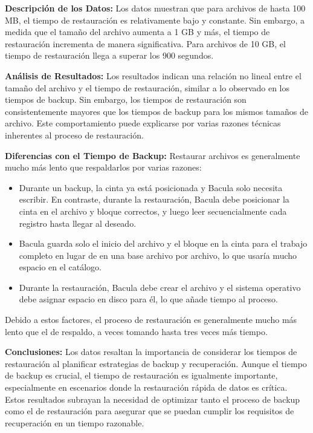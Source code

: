 \textbf{Descripción de los Datos:}
Los datos muestran que para archivos de hasta 100 MB, el tiempo de restauración es relativamente bajo y constante. Sin embargo, a medida que el tamaño del archivo aumenta a 1 GB y más, el tiempo de restauración incrementa de manera significativa. Para archivos de 10 GB, el tiempo de restauración llega a superar los 900 segundos.

\textbf{Análisis de Resultados:}
Los resultados indican una relación no lineal entre el tamaño del archivo y el tiempo de restauración, similar a lo observado en los tiempos de backup. Sin embargo, los tiempos de restauración son consistentemente mayores que los tiempos de backup para los mismos tamaños de archivo. Este comportamiento puede explicarse por varias razones técnicas inherentes al proceso de restauración.

\textbf{Diferencias con el Tiempo de Backup:}
Restaurar archivos es generalmente mucho más lento que respaldarlos por varias razones:
\begin{itemize}
    \item Durante un backup, la cinta ya está posicionada y Bacula solo necesita escribir. En contraste, durante la restauración, Bacula debe posicionar la cinta en el archivo y bloque correctos, y luego leer secuencialmente cada registro hasta llegar al deseado.
    \item Bacula guarda solo el inicio del archivo y el bloque en la cinta para el trabajo completo en lugar de en una base archivo por archivo, lo que usaría mucho espacio en el catálogo.
    \item Durante la restauración, Bacula debe crear el archivo y el sistema operativo debe asignar espacio en disco para él, lo que añade tiempo al proceso.
\end{itemize}

Debido a estos factores, el proceso de restauración es generalmente mucho más lento que el de respaldo, a veces tomando hasta tres veces más tiempo.

\textbf{Conclusiones:}
Los datos resaltan la importancia de considerar los tiempos de restauración al planificar estrategias de backup y recuperación. Aunque el tiempo de backup es crucial, el tiempo de restauración es igualmente importante, especialmente en escenarios donde la restauración rápida de datos es crítica. Estos resultados subrayan la necesidad de optimizar tanto el proceso de backup como el de restauración para asegurar que se puedan cumplir los requisitos de recuperación en un tiempo razonable.

